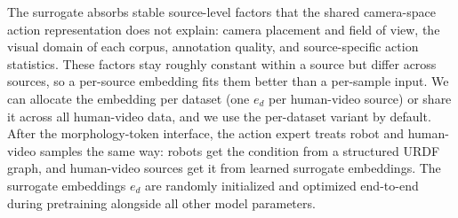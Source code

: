 \documentclass{llmxive}
\begin{document}
The surrogate absorbs stable source-level factors that the shared camera-space action representation does not explain: camera placement and field of view, the visual domain of each corpus, annotation quality, and source-specific action statistics. These factors stay roughly constant within a source but differ across sources, so a per-source embedding fits them better than a per-sample input. We can allocate the embedding per dataset (one $e_{d}$ per human-video source) or share it across all human-video data, and we use the per-dataset variant by default. After the morphology-token interface, the action expert treats robot and human-video samples the same way: robots get the condition from a structured URDF graph, and human-video sources get it from learned surrogate embeddings. The surrogate embeddings $e_d$ are randomly initialized and optimized end-to-end during pretraining alongside all other model parameters.





\end{document}
